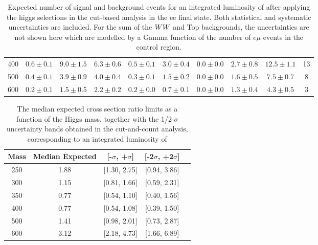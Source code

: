 \begin{table}[!ht]
{\begin{center}
\begin{tabular}{l | c c |  c c c c c c | c }
400 & $0.6\pm0.1$ & $9.0\pm1.5$ & $6.3\pm0.6$ & $0.5\pm0.1$ & $3.0\pm0.4$ & $0.0\pm0.0$ & $2.7\pm0.8$ & $12.5\pm1.1$ & 13 \\
500 & $0.4\pm0.1$ & $3.9\pm0.9$ & $4.0\pm0.4$ & $0.3\pm0.1$ & $1.5\pm0.2$ & $0.0\pm0.0$ & $1.6\pm0.5$ & $7.5\pm0.7$ & 8 \\
600 & $0.2\pm0.1$ & $1.5\pm0.5$ & $2.2\pm0.2$ & $0.2\pm0.0$ & $0.7\pm0.1$ & $0.0\pm0.0$ & $1.3\pm0.4$ & $4.3\pm0.5$ & 3 \\
\hline\hline
\end{tabular}
\end{center}
}
\caption{Expected number of signal and background events for an integrated luminosity of \intlumi after applying the higgs selections 
  in the cut-based analysis in the ee final state. Both statistical and systematic uncertainties are included. For the sum of the $WW$ and Top backgrounds, the uncertainties are 
  not shown here which are modelled by a Gamma function of the number of $e\mu$ events in the control region.  }
\label{tab:yield_cutbased}
\end{table}

\begin{table}[!ht]
\begin{center}
\begin{tabular}{ccccc}
\hline\hline
Mass & Median Expected & [-$\sigma$, +$\sigma$] & [-2$\sigma$, +2$\sigma$]\\\hline
250 & 1.88 & [1.30, 2.75] & [0.94, 3.86] \\
300 & 1.15 & [0.81, 1.66] & [0.59, 2.31] \\
350 & 0.77 & [0.54, 1.10] & [0.40, 1.56] \\
400 & 0.77 & [0.54, 1.08] & [0.39, 1.50] \\
500 & 1.41 & [0.98, 2.01] & [0.73, 2.87] \\
600 & 3.12 & [2.18, 4.73] & [1.66, 6.89] \\
\hline\hline
\end{tabular}
\end{center}
\caption{The median expected cross section ratio limits as a function 
of the Higgs mass, together with the 1/2-$\sigma$ uncertainty bands obtained in the cut-and-count analysis, corresponding to 
an integrated luminosity of \intlumi}
\label{tab:limits_cutbased_4fb}
\end{table}

